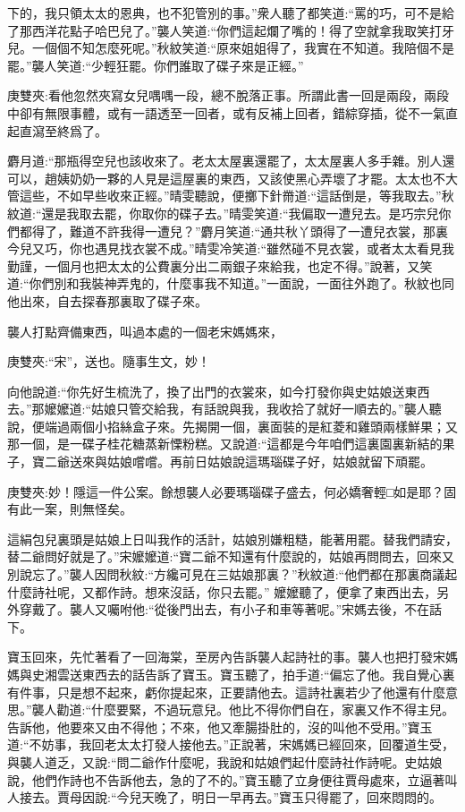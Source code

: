 \begin{parag}
下的，我只領太太的恩典，也不犯管別的事。”衆人聽了都笑道:“罵的巧，可不是給了那西洋花點子哈巴兒了。”襲人笑道:“你們這起爛了嘴的！得了空就拿我取笑打牙兒。一個個不知怎麼死呢。”秋紋笑道:“原來姐姐得了，我實在不知道。我陪個不是罷。”襲人笑道:“少輕狂罷。你們誰取了碟子來是正經。”\begin{note}庚雙夾:看他忽然夾寫女兒喁喁一段，總不脫落正事。所謂此書一回是兩段，兩段中卻有無限事體，或有一語透至一回者，或有反補上回者，錯綜穿插，從不一氣直起直瀉至終爲了。\end{note}麝月道:“那瓶得空兒也該收來了。老太太屋裏還罷了，太太屋裏人多手雜。別人還可以，趙姨奶奶一夥的人見是這屋裏的東西，又該使黑心弄壞了才罷。太太也不大管這些，不如早些收來正經。”晴雯聽說，便擲下針黹道:“這話倒是，等我取去。”秋紋道:“還是我取去罷，你取你的碟子去。”晴雯笑道:“我偏取一遭兒去。是巧宗兒你們都得了，難道不許我得一遭兒？”麝月笑道:“通共秋丫頭得了一遭兒衣裳，那裏今兒又巧，你也遇見找衣裳不成。”晴雯冷笑道:“雖然碰不見衣裳，或者太太看見我勤謹，一個月也把太太的公費裏分出二兩銀子來給我，也定不得。”說著，又笑道:“你們別和我裝神弄鬼的，什麼事我不知道。”一面說，一面往外跑了。秋紋也同他出來，自去探春那裏取了碟子來。
\end{parag}


\begin{parag}
    襲人打點齊備東西，叫過本處的一個老宋媽媽來，\begin{note}庚雙夾:“宋”，送也。隨事生文，妙！\end{note}向他說道:“你先好生梳洗了，換了出門的衣裳來，如今打發你與史姑娘送東西去。”那嬤嬤道:“姑娘只管交給我，有話說與我，我收拾了就好一順去的。”襲人聽說，便端過兩個小掐絲盒子來。先揭開一個，裏面裝的是紅菱和雞頭兩樣鮮果；又那一個，是一碟子桂花糖蒸新慄粉糕。又說道:“這都是今年咱們這裏園裏新結的果子，寶二爺送來與姑娘嚐嚐。再前日姑娘說這瑪瑙碟子好，姑娘就留下頑罷。\begin{note}庚雙夾:妙！隱這一件公案。餘想襲人必要瑪瑙碟子盛去，何必嬌奢輕□如是耶？固有此一案，則無怪矣。\end{note}這絹包兒裏頭是姑娘上日叫我作的活計，姑娘別嫌粗糙，能著用罷。替我們請安，替二爺問好就是了。”宋嬤嬤道:“寶二爺不知還有什麼說的，姑娘再問問去，回來又別說忘了。”襲人因問秋紋:“方纔可見在三姑娘那裏？”秋紋道:“他們都在那裏商議起什麼詩社呢，又都作詩。想來沒話，你只去罷。” 嬤嬤聽了，便拿了東西出去，另外穿戴了。襲人又囑咐他:“從後門出去，有小子和車等著呢。”宋媽去後，不在話下。
\end{parag}


\begin{parag}
    寶玉回來，先忙著看了一回海棠，至房內告訴襲人起詩社的事。襲人也把打發宋媽媽與史湘雲送東西去的話告訴了寶玉。寶玉聽了，拍手道:“偏忘了他。我自覺心裏有件事，只是想不起來，虧你提起來，正要請他去。這詩社裏若少了他還有什麼意思。”襲人勸道:“什麼要緊，不過玩意兒。他比不得你們自在，家裏又作不得主兒。告訴他，他要來又由不得他；不來，他又牽腸掛肚的，沒的叫他不受用。”寶玉道:“不妨事，我回老太太打發人接他去。”正說著，宋媽媽已經回來，回覆道生受，與襲人道乏，又說:“問二爺作什麼呢，我說和姑娘們起什麼詩社作詩呢。史姑娘說，他們作詩也不告訴他去，急的了不的。”寶玉聽了立身便往賈母處來，立逼著叫人接去。賈母因說:“今兒天晚了，明日一早再去。”寶玉只得罷了，回來悶悶的。
\end{parag}


